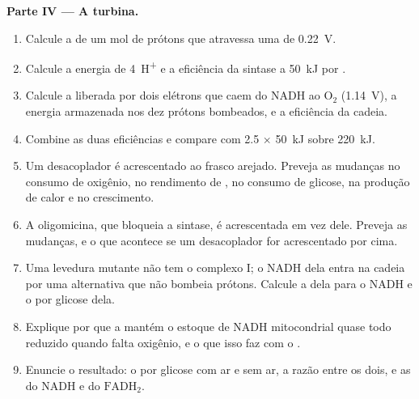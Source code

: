 \begin{problem}
\medskip
\noindent\textbf{Parte IV --- A turbina.}
\begin{enumerate}[resume]
  \item Calcule a  de um mol de prótons que atravessa uma
         de \qty{0.22}{V}.
  \item Calcule a energia de \qty{4}{H^+} e a eficiência da sintase a
        \qty{50}{kJ} por .
  \item Calcule a  liberada por dois elétrons que caem do
        NADH ao $\mathrm{O_2}$ (\qty{1.14}{V}), a energia armazenada nos
        dez prótons bombeados, e a eficiência da cadeia.
  \item Combine as duas eficiências e compare com 2.5  $\times$
        \qty{50}{kJ} sobre \qty{220}{kJ}.
  \item Um desacoplador é acrescentado ao frasco arejado. Preveja as
        mudanças no consumo de oxigênio, no rendimento de , no
        consumo de glicose, na produção de calor e no crescimento.
  \item A oligomicina, que bloqueia a sintase, é acrescentada em vez
        dele. Preveja as mudanças, e o que acontece se um desacoplador
        for acrescentado por cima.
  \item Uma levedura mutante não tem o complexo I; o NADH dela entra na
        cadeia por uma  alternativa que não bombeia prótons.
        Calcule a  dela para o NADH e o  por glicose dela.
  \item Explique por que a  mantém o estoque de NADH mitocondrial
        quase todo reduzido quando falta oxigênio, e o que isso faz com
        o .
  \item Enuncie o resultado: o  por glicose com ar e sem ar, a razão
        entre os dois, e as  do NADH e do $\mathrm{FADH_2}$.
\end{enumerate}
\end{problem}
